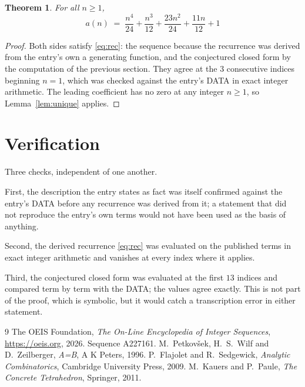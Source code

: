 \documentclass[11pt,a4paper]{article}
\theoremstyle{plain}
\newtheorem{theorem}{Theorem}
\theoremstyle{definition}
\begin{document}
\begin{theorem}
For all $n\ge 1$,
\[
a(n) \;=\; \frac{n^{4}}{24} + \frac{n^{3}}{12} + \frac{23 n^{2}}{24} + \frac{11 n}{12} + 1
\]
\end{theorem}

\begin{proof}
Both sides satisfy \eqref{eq:rec}: the sequence because the recurrence was derived from
the entry's own a generating function, and the conjectured closed form by the computation of the
previous section. They agree at the $3$ consecutive indices beginning
$n=1$, which was checked against the entry's DATA in exact integer arithmetic.
The leading coefficient has no zero at any integer $n\ge1$, so
Lemma~\ref{lem:unique} applies.
\end{proof}

\section{Verification}

Three checks, independent of one another.

First, the description the entry states as fact was itself confirmed against the entry's
DATA before any recurrence was derived from it; a statement that did not reproduce the
entry's own terms would not have been used as the basis of anything.

Second, the derived recurrence \eqref{eq:rec} was evaluated on the published terms in
exact integer arithmetic and vanishes at every index where it applies.

Third, the conjectured closed form was evaluated at the first $13$ indices and
compared term by term with the DATA; the values agree exactly. This is not part of the
proof, which is symbolic, but it would catch a transcription error in either statement.

\begin{thebibliography}{9}
 The OEIS Foundation, \emph{The On-Line Encyclopedia of Integer Sequences},
\url{https://oeis.org}, 2026. Sequence A227161.
 M.~Petkov\v{s}ek, H.~S.~Wilf and D.~Zeilberger, \emph{A=B}, A K Peters,
1996.
 P.~Flajolet and R.~Sedgewick, \emph{Analytic Combinatorics}, Cambridge
University Press, 2009.
 M.~Kauers and P.~Paule, \emph{The Concrete Tetrahedron}, Springer, 2011.
\end{thebibliography}
\end{document}
